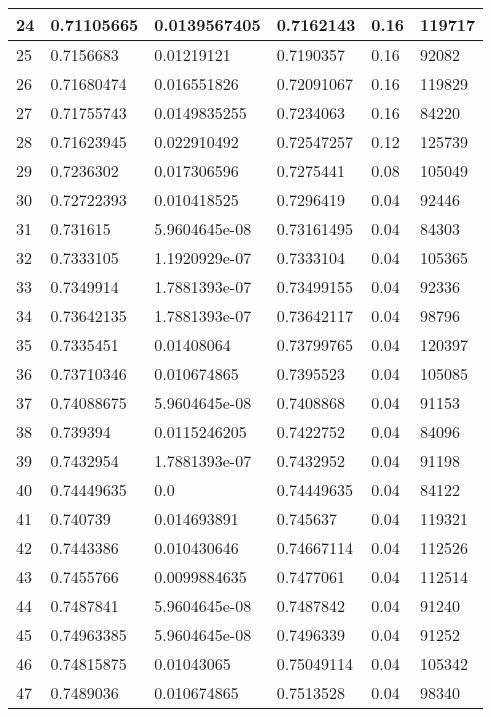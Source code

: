 \begin{longtable}{|l|l|l|l|l|l|}
24 & 0.71105665 & 0.0139567405 & 0.7162143 & 0.16 & 119717 \\ \hline 
25 & 0.7156683 & 0.01219121 & 0.7190357 & 0.16 & 92082 \\ \hline 
26 & 0.71680474 & 0.016551826 & 0.72091067 & 0.16 & 119829 \\ \hline 
27 & 0.71755743 & 0.0149835255 & 0.7234063 & 0.16 & 84220 \\ \hline 
28 & 0.71623945 & 0.022910492 & 0.72547257 & 0.12 & 125739 \\ \hline 
29 & 0.7236302 & 0.017306596 & 0.7275441 & 0.08 & 105049 \\ \hline 
30 & 0.72722393 & 0.010418525 & 0.7296419 & 0.04 & 92446 \\ \hline 
31 & 0.731615 & 5.9604645e-08 & 0.73161495 & 0.04 & 84303 \\ \hline 
32 & 0.7333105 & 1.1920929e-07 & 0.7333104 & 0.04 & 105365 \\ \hline 
33 & 0.7349914 & 1.7881393e-07 & 0.73499155 & 0.04 & 92336 \\ \hline 
34 & 0.73642135 & 1.7881393e-07 & 0.73642117 & 0.04 & 98796 \\ \hline 
35 & 0.7335451 & 0.01408064 & 0.73799765 & 0.04 & 120397 \\ \hline 
36 & 0.73710346 & 0.010674865 & 0.7395523 & 0.04 & 105085 \\ \hline 
37 & 0.74088675 & 5.9604645e-08 & 0.7408868 & 0.04 & 91153 \\ \hline 
38 & 0.739394 & 0.0115246205 & 0.7422752 & 0.04 & 84096 \\ \hline 
39 & 0.7432954 & 1.7881393e-07 & 0.7432952 & 0.04 & 91198 \\ \hline 
40 & 0.74449635 & 0.0 & 0.74449635 & 0.04 & 84122 \\ \hline 
41 & 0.740739 & 0.014693891 & 0.745637 & 0.04 & 119321 \\ \hline 
42 & 0.7443386 & 0.010430646 & 0.74667114 & 0.04 & 112526 \\ \hline 
43 & 0.7455766 & 0.0099884635 & 0.7477061 & 0.04 & 112514 \\ \hline 
44 & 0.7487841 & 5.9604645e-08 & 0.7487842 & 0.04 & 91240 \\ \hline 
45 & 0.74963385 & 5.9604645e-08 & 0.7496339 & 0.04 & 91252 \\ \hline 
46 & 0.74815875 & 0.01043065 & 0.75049114 & 0.04 & 105342 \\ \hline 
47 & 0.7489036 & 0.010674865 & 0.7513528 & 0.04 & 98340 \\ \hline 

\end{longtable}
